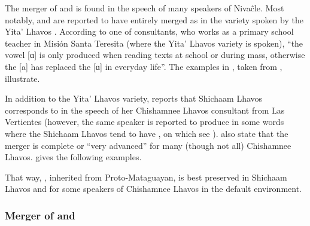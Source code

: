 The merger of  and  is found in the speech of many speakers of Nivaĉle. Most notably,  and  are reported to have entirely merged as  in the variety spoken by the Yita’ Lhavos \citep[37]{AnG15}. According to one of  consultants, who works as a primary school teacher in Misión Santa Teresita (where the Yita’ Lhavos variety is spoken), ``the vowel [ɑ] is only produced when reading texts at school or during mass, otherwise the [a] has replaced the [ɑ] in everyday life''. The examples in , taken from \citet[37--38]{AnG15}, illustrate.

\ea \label{ni-yita-ao-a}
    \begin{xlist}
        \ex {} \recind {}
        \ex {} \recind {}
        \ex {} \recind {}
        \ex {} \recind {}
        \ex {} \recind {}
        \ex {} \recind {}
        \ex {} \recind {}
    \end{xlist}
\z

In addition to the Yita' Lhavos variety, \citet[534--535]{NS87} reports that Shichaam Lhavos  corresponds to  in the speech of her Chishamnee Lhavos consultant from Las Vertientes (however, the same speaker is reported to produce  in some words where the Shichaam Lhavos tend to have , on which see ). \citet[8]{LC20} also state that the merger is complete or ``very advanced'' for many (though not all) Chishamnee Lhavos. \citet[504, 507]{NS87} gives the following examples.

\ea\label{ni-chishamnee-ao-a}
    \begin{xlist}
        \ex {} \recind {}
        \ex {} \recind {}
        \ex {} \recind {}
    \end{xlist}
\z
{}

That way, , inherited from Proto-Mataguayan, is best preserved in Shichaam Lhavos and for some speakers of Chishamnee Lhavos in the default environment.

\subsubsection{Merger of  and }\label{ni-chishaam-rounding}

